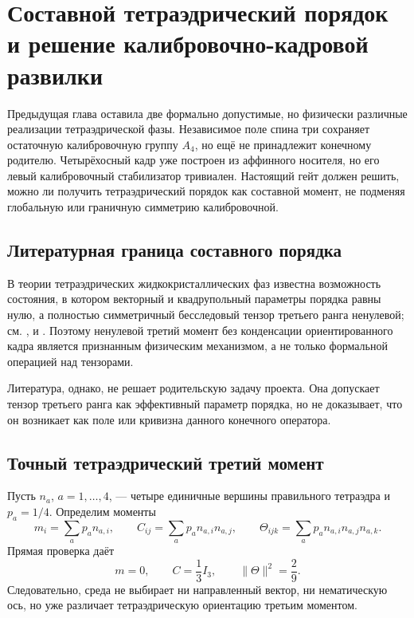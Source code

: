 \chapter[Составной тетраэдрический порядок]{Составной тетраэдрический
порядок и решение калибровочно-кадровой развилки}

Предыдущая глава оставила две формально допустимые, но физически различные
реализации тетраэдрической фазы. Независимое поле спина три сохраняет
остаточную калибровочную группу $A_4$, но ещё не принадлежит конечному
родителю. Четырёхосный кадр уже построен из аффинного носителя, но его
левый калибровочный стабилизатор тривиален. Настоящий гейт должен решить,
можно ли получить тетраэдрический порядок как составной момент, не
подменяя глобальную или граничную симметрию калибровочной.

\section{Литературная граница составного порядка}

В теории тетраэдрических жидкокристаллических фаз известна возможность
состояния, в котором векторный и квадрупольный параметры порядка равны
нулю, а полностью симметричный бесследовый тензор третьего ранга ненулевой;
см. ,  и
. Поэтому ненулевой третий момент без
конденсации ориентированного кадра является признанным физическим
механизмом, а не только формальной операцией над тензорами.

Литература, однако, не решает родительскую задачу проекта. Она допускает
тензор третьего ранга как эффективный параметр порядка, но не доказывает,
что он возникает как поле или кривизна данного конечного оператора.

\section{Точный тетраэдрический третий момент}

Пусть $n_a$, $a=1,\ldots,4$, --- четыре единичные вершины правильного
тетраэдра и $p_a=1/4$. Определим моменты
\begin{equation}
 m_i=\sum_ap_a n_{a,i},\qquad
 C_{ij}=\sum_ap_a n_{a,i}n_{a,j},\qquad
 \Theta_{ijk}=\sum_ap_a n_{a,i}n_{a,j}n_{a,k}.
 \label{eq:v6-tetrahedral-moment-hierarchy}
\end{equation}
Прямая проверка даёт
\begin{equation}
 m=0,\qquad C=\frac13I_3,\qquad
 \|\Theta\|^2=\frac29.
 \label{eq:v6-pure-third-rank-order}
\end{equation}
Следовательно, среда не выбирает ни направленный вектор, ни нематическую
ось, но уже различает тетраэдрическую ориентацию третьим моментом.

